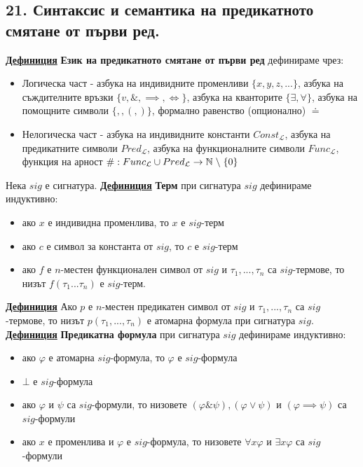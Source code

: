 \documentclass{article}
\begin{document}
\subsection*{\color{bordeaux}21. Синтаксис и семантика на предикатното смятане от първи ред.}
\textbf{\underline{Дефиниция}}
\textbf{Език на предикатното смятане от първи ред} дефинираме чрез:
\begin{itemize}
    \item Логическа част - азбука на индивидните променливи $\{x, y, z, ...\}$, азбука на съждителните връзки $\{v, \&, \implies, \iff\}$,
    азбука на кванторите $\{\exists, \forall\}$, азбука на помощните символи $\{,, (, )\}$, формално равенство (опционално) $\doteq$
    \item Нелогическа част - азбука на индивидните константи $Const_{\mathcal{L}}$, азбука на предикатните символи $Pred_{\mathcal{L}}$,
    азбука на функционалните символи $Func_{\mathcal{L}}$, функция на арност $\#: Func_{\mathcal{L}} \cup Pred_{\mathcal{L}} \rightarrow
    \mathbb{N} \hspace{0.1cm} \backslash \hspace{0.1cm} \{0\}$
\end{itemize}
Нека $sig$ е сигнатура. \newline\newline
\textbf{\underline{Дефиниция}}
\textbf{Терм} при сигнатура $sig$ дефинираме индуктивно:
\begin{itemize}
    \item ако $x$ е индивидна променлива, то $x$ е $sig$-терм
    \item ако $c$ е символ за константа от $sig$, то $c$ е $sig$-терм
    \item ако $f$ е $n$-местен функционален символ от $sig$ и $\tau_1, ..., \tau_n$ са $sig$-термове, то низът $f(\tau_1 ... \tau_n)$ е $sig$-терм.
\end{itemize}
\textbf{\underline{Дефиниция}}
Ако $p$ е $n$-местен предикатен символ от $sig$ и $\tau_1, ..., \tau_n$ са $sig$-термове, то низът $p(\tau_1, ..., \tau_n)$ е атомарна формула
при сигнатура $sig$. \newline\newline
\textbf{\underline{Дефиниция}} \textbf{Предикатна формула} при сигнатура $sig$ дефинираме индуктивно:
\begin{itemize}
    \item ако $\varphi$ е атомарна $sig$-формула, то $\varphi$ е $sig$-формула
    \item $\bot$ е $sig$-формула
    \item ако $\varphi$ и $\psi$ са $sig$-формули, то низовете $(\varphi \& \psi), (\varphi \vee \psi)$ и $(\varphi \implies \psi)$ са $sig$-формули 
    \item ако $x$ е променлива и $\varphi$ е $sig$-формула, то низовете $\forall x\varphi$ и $\exists x\varphi$ са $sig$-формули
\end{itemize}
\end{document}
